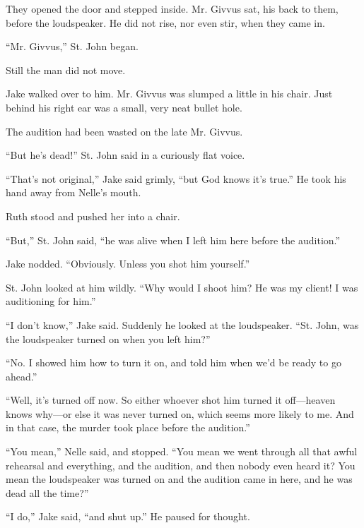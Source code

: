 \documentclass{novel}
\begin{document}
They opened the door and stepped inside. Mr. Givvus sat, his back to them, before the loudspeaker. He did not rise, nor even stir, when they came in.

“Mr. Givvus,” St. John began.

Still the man did not move.

Jake walked over to him. Mr. Givvus was slumped a little in his chair. Just behind his right ear was a small, very neat bullet hole.

The audition had been wasted on the late Mr. Givvus.

\begin{ChapterStart}
\vspace{3\nbs}
\end{ChapterStart}

“But he’s dead!” St. John said in a curiously flat voice.

“That’s not original,” Jake said grimly, “but God knows it’s true.” He took his hand away from Nelle’s mouth.

Ruth stood and pushed her into a chair.

“But,” St. John said, “he was alive when I left him here before the audition.”

Jake nodded. “Obviously. Unless you shot him yourself.”

St. John looked at him wildly. “Why would I shoot him? He was my client! I was auditioning for him.”

“I don’t know,” Jake said. Suddenly he looked at the loudspeaker. “St. John, was the loudspeaker turned on when you left him?”

“No. I showed him how to turn it on, and told him when we’d be ready to go ahead.”

“Well, it’s turned off now. So either whoever shot him turned it off—heaven knows why—or else it was never turned on, which seems more likely to me. And in that case, the murder took place before the audition.”

“You mean,” Nelle said, and stopped. “You mean we went through all that awful rehearsal and everything, and the audition, and then nobody even heard it? You mean the loudspeaker was turned on and the audition came in here, and he was dead all the time?”

“I do,” Jake said, “and shut up.” He paused for thought.
\end{document}
